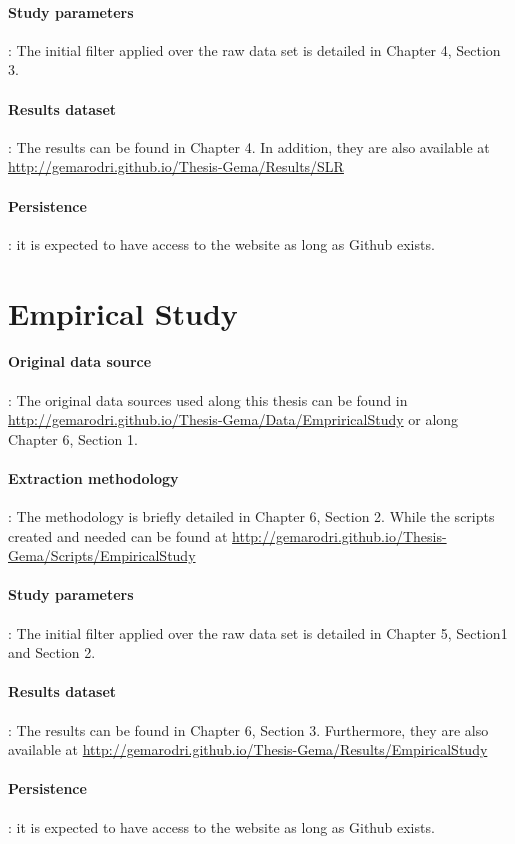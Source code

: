 \documentclass[a4paper, 12pt]{book}
\begin{document}
\paragraph{Study parameters}: The initial filter applied over the raw data set is detailed in Chapter 4, Section 3. 
\paragraph{Results dataset}: The results can be found in Chapter 4. In addition, they are also available at \url{http://gemarodri.github.io/Thesis-Gema/Results/SLR}
\paragraph{Persistence}: it is expected to have access to the website as long as Github exists. 

\section{Empirical Study}
\label{sec:replicabilityEmpirical}
\paragraph{Original data source}: The original data sources used along this thesis can be found in \url{http://gemarodri.github.io/Thesis-Gema/Data/EmpriricalStudy} or along Chapter 6, Section 1.
\paragraph{Extraction methodology}: The methodology is briefly detailed in Chapter 6, Section 2. While the scripts created and needed can be found at \url{http://gemarodri.github.io/Thesis-Gema/Scripts/EmpiricalStudy}
\paragraph{Study parameters}: The initial filter applied over the raw data set is detailed in Chapter 5, Section1 and Section 2. 
\paragraph{Results dataset}: The results can be found in Chapter 6, Section 3. Furthermore, they are also available at \url{http://gemarodri.github.io/Thesis-Gema/Results/EmpiricalStudy}
\paragraph{Persistence}:  it is expected to have access to the website as long as Github exists. 
\end{document}
